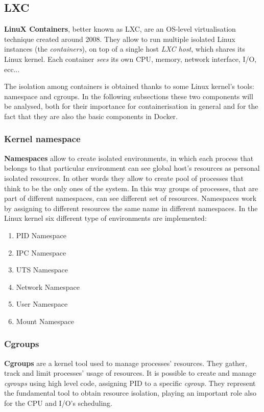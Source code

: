 \documentclass[a4paper,12pt]{article}
\begin{document}

\subsection{LXC}

\textbf{LinuX Containers}, better known as LXC, are an OS-level virtualisation
technique created around 2008. They allow to run multiple isolated Linux
instances (the \textit{containers}), on top of a single host \textit{LXC host},
which shares its Linux kernel. Each container \textit{sees} its own CPU, memory,
network interface, I/O, ecc... \par The isolation among containers is obtained
thanks to some Linux kernel's tools: namespace and cgroups. In the following
subsections these two components will be analysed, both for their importance for
containerisation in general and for the fact that they are also the basic
components in Docker.

\subsubsection{Kernel namespace}

\textbf{Namespaces} allow to create isolated environments, in which each process
that belongs to that particular environment can see global host's resources as
personal isolated resources. In other words they allow to create pool of
processes that think to be the only ones of the system. In this way groups of
processes, that are part of different namespaces, can see different set of
resources. Namespaces work by assigning to different resources the same name in
different namespaces. In the Linux kernel six different type of environments are
implemented:
  \begin{enumerate}
    \item PID Namespace
    \item IPC Namespace
    \item UTS Namespace
    \item Network Namespace
    \item User Namespace
    \item Mount Namespace
  \end{enumerate} 

\subsubsection{Cgroups}

\textbf{Cgroups} are a kernel tool used to manage processes' resources. They
gather, track and limit processes' usage of resources. It is possible to create
and manage \textit{cgroups} using high level code, assigning PID to a specific
\textit{cgroup}. They represent the fundamental tool to obtain resource
isolation, playing an important role also for the CPU and I/O's scheduling.  
\end{document}
